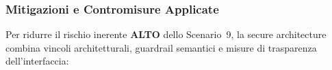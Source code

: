 \documentclass[11pt,a4paper]{article}
\begin{document}
%

\subsubsection{Mitigazioni e Contromisure Applicate}

Per ridurre il rischio inerente \textbf{ALTO} dello Scenario~9, la secure architecture combina vincoli architetturali, guardrail semantici e misure di trasparenza dell'interfaccia:
\end{document}
